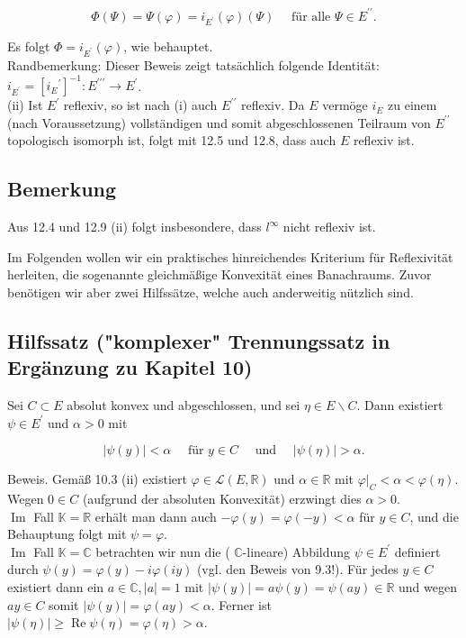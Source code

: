 \documentclass[10pt, letterpaper]{article}
\begin{document}
$$
\Phi(\Psi)=\Psi(\varphi)=i_{E^{\prime}}(\varphi)(\Psi) \quad \text { für alle } \Psi \in E^{\prime \prime} .
$$

Es folgt $\Phi=i_{E^{\prime}}(\varphi)$, wie behauptet.\\
Randbemerkung: Dieser Beweis zeigt tatsächlich folgende Identität: $i_{E^{\prime}}=\left[i_{E}{ }^{\prime}\right]^{-1}: E^{\prime \prime \prime} \rightarrow E^{\prime}$.\\
(ii) Ist $E^{\prime}$ reflexiv, so ist nach (i) auch $E^{\prime \prime}$ reflexiv. Da $E$ vermöge $i_{E}$ zu einem (nach Voraussetzung) vollständigen und somit abgeschlossenen Teilraum von $E^{\prime \prime}$ topologisch isomorph ist, folgt mit 12.5 und 12.8, dass auch $E$ reflexiv ist.

\subsection*{Bemerkung}
Aus 12.4 und 12.9 (ii) folgt insbesondere, dass $l^{\infty}$ nicht reflexiv ist.

Im Folgenden wollen wir ein praktisches hinreichendes Kriterium für Reflexivität herleiten, die sogenannte gleichmäßige Konvexität eines Banachraums. Zuvor benötigen wir aber zwei Hilfssätze, welche auch anderweitig nützlich sind.

\subsection*{Hilfssatz ("komplexer" Trennungssatz in Ergänzung zu Kapitel 10)}
Sei $C \subset E$ absolut konvex und abgeschlossen, und sei $\eta \in E \backslash C$. Dann existiert $\psi \in E^{\prime}$ und $\alpha>0$ mit

$$
|\psi(y)|<\alpha \quad \text { für } y \in C \quad \text { und } \quad|\psi(\eta)|>\alpha .
$$

Beweis. Gemäß 10.3 (ii) existiert $\varphi \in \mathcal{L}(E, \mathbb{R})$ und $\alpha \in \mathbb{R}$ mit $\left.\varphi\right|_{C}<\alpha<\varphi(\eta)$. Wegen $0 \in C$ (aufgrund der absoluten Konvexität) erzwingt dies $\alpha>0$.\\
$\operatorname{Im}$ Fall $\mathbb{K}=\mathbb{R}$ erhält man dann auch $-\varphi(y)=\varphi(-y)<\alpha$ für $y \in C$, und die Behauptung folgt mit $\psi=\varphi$.\\
$\operatorname{Im}$ Fall $\mathbb{K}=\mathbb{C}$ betrachten wir nun die ( $\mathbb{C}$-lineare) Abbildung $\psi \in E^{\prime}$ definiert durch $\psi(y)=\varphi(y)-i \varphi(i y)$ (vgl. den Beweis von 9.3!). Für jedes $y \in C$ existiert dann ein $a \in \mathbb{C},|a|=1$ mit $|\psi(y)|=a \psi(y)=\psi(a y) \in \mathbb{R}$ und wegen $a y \in C$ somit $|\psi(y)|=\varphi(a y)<\alpha$. Ferner ist $|\psi(\eta)| \geq \operatorname{Re} \psi(\eta)=\varphi(\eta)>\alpha$.
\end{document}
